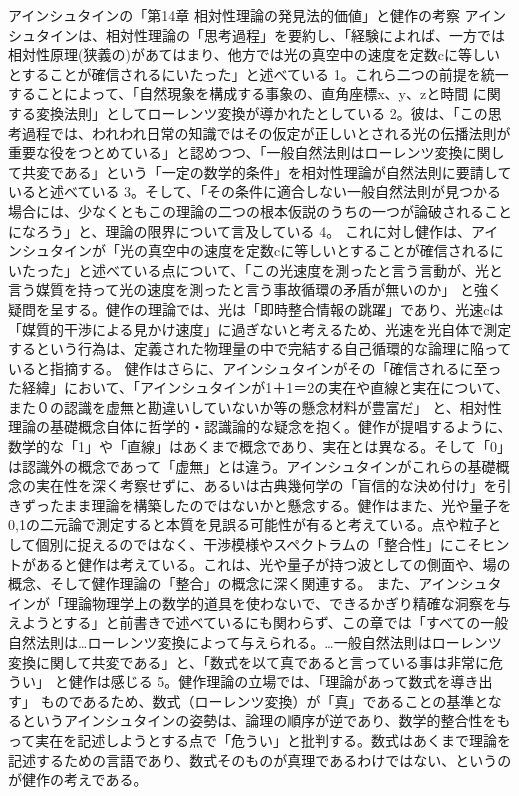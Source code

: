 \documentclass{article}
\begin{document}
アインシュタインの「第14章 相対性理論の発見法的価値」と健作の考察
アインシュタインは、相対性理論の「思考過程」を要約し、「経験によれば、一方では相対性原理(狭義の)があてはまり、他方では光の真空中の速度を定数cに等しいとすることが確信されるにいたった」と述べている 1。これら二つの前提を統一することによって、「自然現象を構成する事象の、直角座標x、y、zと時間 に関する変換法則」としてローレンツ変換が導かれたとしている 2。彼は、「この思考過程では、われわれ日常の知識ではその仮定が正しいとされる光の伝播法則が重要な役をつとめている」と認めつつ、「一般自然法則はローレンツ変換に関して共変である」という「一定の数学的条件」を相対性理論が自然法則に要請していると述べている 3。そして、「その条件に適合しない一般自然法則が見つかる場合には、少なくともこの理論の二つの根本仮説のうちの一つが論破されることになろう」と、理論の限界について言及している 4。
これに対し健作は、アインシュタインが「光の真空中の速度を定数cに等しいとすることが確信されるにいたった」と述べている点について、「この光速度を測ったと言う言動が、光と言う媒質を持って光の速度を測ったと言う事故循環の矛盾が無いのか」 と強く疑問を呈する。健作の理論では、光は「即時整合情報の跳躍」であり、光速cは「媒質的干渉による見かけ速度」に過ぎないと考えるため、光速を光自体で測定するという行為は、定義された物理量の中で完結する自己循環的な論理に陥っていると指摘する。
健作はさらに、アインシュタインがその「確信されるに至った経緯」において、「アインシュタインが1＋1＝2の実在や直線と実在について、また０の認識を虚無と勘違いしていないか等の懸念材料が豊富だ」 と、相対性理論の基礎概念自体に哲学的・認識論的な疑念を抱く。健作が提唱するように、数学的な「1」や「直線」はあくまで概念であり、実在とは異なる。そして「0」は認識外の概念であって「虚無」とは違う。アインシュタインがこれらの基礎概念の実在性を深く考察せずに、あるいは古典幾何学の「盲信的な決め付け」を引きずったまま理論を構築したのではないかと懸念する。健作はまた、光や量子を0,1の二元論で測定すると本質を見誤る可能性が有ると考えている。点や粒子として個別に捉えるのではなく、干渉模様やスペクトラムの「整合性」にこそヒントがあると健作は考えている。これは、光や量子が持つ波としての側面や、場の概念、そして健作理論の「整合」の概念に深く関連する。
また、アインシュタインが「理論物理学上の数学的道具を使わないで、できるかぎり精確な洞察を与えようとする」と前書きで述べているにも関わらず、この章では「すべての一般自然法則は…ローレンツ変換によって与えられる。…一般自然法則はローレンツ変換に関して共変である」と、「数式を以て真であると言っている事は非常に危うい」 と健作は感じる 5。健作理論の立場では、「理論があって数式を導き出す」 ものであるため、数式（ローレンツ変換）が「真」であることの基準となるというアインシュタインの姿勢は、論理の順序が逆であり、数学的整合性をもって実在を記述しようとする点で「危うい」と批判する。数式はあくまで理論を記述するための言語であり、数式そのものが真理であるわけではない、というのが健作の考えである。
\end{document}
